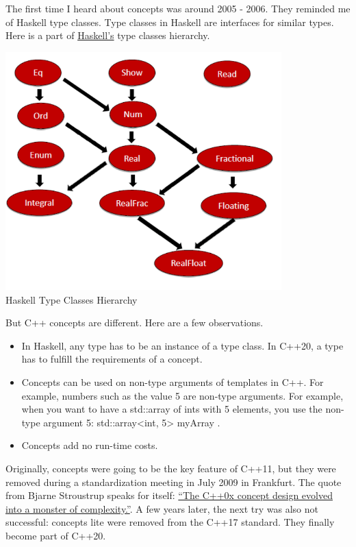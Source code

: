 
The first time I heard about concepts was around 2005 - 2006. They reminded me of Haskell type classes. Type classes in Haskell are interfaces for similar types. Here is a part of \href{https://en.wikipedia.org/wiki/Haskell_(programming_language)}{Haskell’s} type classes hierarchy.

\begin{center}
\includegraphics[width=0.8\textwidth]{content/3/chapter4/images/7.png}\\
Haskell Type Classes Hierarchy
\end{center}

But C++ concepts are different. Here are a few observations.

\begin{itemize}
\item 
In Haskell, any type has to be an instance of a type class. In C++20, a type has to fulfill the requirements of a concept.

\item 
Concepts can be used on non-type arguments of templates in C++. For example, numbers such as the value 5 are non-type arguments. For example, when you want to have a std::array of ints with 5 elements, you use the non-type argument 5: std::array<int, 5> myArray .

\item 
Concepts add no run-time costs.
\end{itemize}

Originally, concepts were going to be the key feature of C++11, but they were removed during a standardization meeting in July 2009 in Frankfurt. The quote from Bjarne Stroustrup speaks for itself: \href{https://isocpp.org/blog/2013/02/concepts-lite-constraining-templates-with-predicates-andrew-sutton-bjarne-s}{“The C++0x concept design evolved into a monster of complexity.”}. A few years later, the next try was also not successful: concepts lite were removed from the C++17 standard. They finally become part of C++20.

